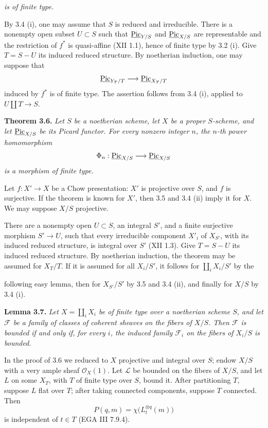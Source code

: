 \emph{is of finite type.}

By 3.4 (i), one may assume that \(S\) is reduced and irreducible. There
is a nonempty open subset \(U\subset S\) such that
\(\underline{\operatorname{Pic}}_{Y/S}\) and \(\underline{\operatorname{Pic}}_{X/S}\) are
representable and the restriction of \(f^*\) is quasi-affine (XII 1.1),
hence of finite type by 3.2 (i). Give \(T=S-U\) its induced reduced
structure. By noetherian induction, one may suppose that
\[
\underline{\operatorname{Pic}}_{Y_T/T}\longrightarrow\underline{\operatorname{Pic}}_{X_T/T}
\]
induced by \(f^*\) is of finite type. The assertion follows from 3.4 (i),
applied to \(U\amalg T\to S\).

\textbf{Theorem 3.6.} \emph{Let \(S\) be a noetherian scheme, let \(X\)
be a proper \(S\)-scheme, and let \(\underline{\operatorname{Pic}}_{X/S}\) be its
Picard functor. For every nonzero integer \(n\), the \(n\)-th power
homomorphism}
\[
\Phi_n:\underline{\operatorname{Pic}}_{X/S}\longrightarrow\underline{\operatorname{Pic}}_{X/S}
\]
\emph{is a morphism of finite type.}

Let \(f:X'\to X\) be a Chow presentation: \(X'\) is projective over \(S\),
and \(f\) is surjective. If the theorem is known for \(X'\), then 3.5 and
3.4 (ii) imply it for \(X\). We may suppose \(X/S\) projective.

There are a nonempty open \(U\subset S\), an integral \(S'\), and a
finite surjective morphism \(S'\to U\), such that every irreducible
component \(X'_i\) of \(X_{S'}\), with its induced reduced structure, is
integral over \(S'\) (XII 1.3). Give \(T=S-U\) its induced reduced
structure. By noetherian induction, the theorem may be assumed for
\(X_T/T\). If it is assumed for all \(X_i/S'\), it follows for
\(\coprod_iX_i/S'\) by the

following easy lemma, then for \(X_{S'}/S'\) by 3.5 and 3.4 (ii), and
finally for \(X/S\) by 3.4 (i).

\textbf{Lemma 3.7.} \emph{Let \(X=\coprod_iX_i\) be of finite type over a
noetherian scheme \(S\), and let \(\mathcal F\) be a family of classes of
coherent sheaves on the fibers of \(X/S\). Then \(\mathcal F\) is bounded
if and only if, for every \(i\), the induced family \(\mathcal F_i\) on
the fibers of \(X_i/S\) is bounded.}

In the proof of 3.6 we reduced to \(X\) projective and integral over \(S\);
endow \(X/S\) with a very ample sheaf \(\mathcal O_X(1)\). Let
\(\mathscr L\) be bounded on the fibers of \(X/S\), and let \(L\) on some
\(X_T\), with \(T\) of finite type over \(S\), bound it. After
partitioning \(T\), suppose \(L\) flat over \(T\); after taking connected
components, suppose \(T\) connected. Then
\[
P(q,m)=\chi\bigl(L_t^{\otimes q}(m)\bigr)
\]
is independent of \(t\in T\) (EGA III 7.9.4).

